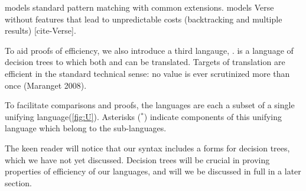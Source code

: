 \documentclass[manuscript,screen,review, 12pt]{acmart}
\begin{document}
{\PPlus} models standard pattern matching with common extensions. {\VMinus}
models Verse without features that lead to unpredictable costs (backtracking and
multiple results) [cite-Verse]. 

To aid proofs of efficiency, we also introduce a third langauge, {\D}. {\D} is a
language of decision trees to which both {\PPlus} and {\VMinus} can be
translated. Targets of translation are efficient in the standard technical
sense: no value is ever scrutinized more than once (Maranget 2008).

To facilitate comparisons and proofs, the languages are each a subset of a
single unifying language(\cref{fig:U}). Asterisks (${}^{*}$) indicate components
of this unifying language which belong to the sub-languages. 

The keen reader will notice that our syntax includes a forms for decision trees,
which we have not yet discussed. Decision trees will be crucial in proving
properties of efficiency of our languages, and will we be discussed in full in a
later section. 
\end{document}
